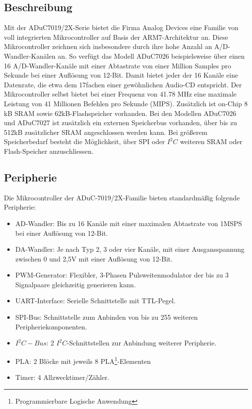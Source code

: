     \subsection{Beschreibung}
        Mit der ADuC7019/2X-Serie bietet die Firma Analog Devices eine Familie von voll integrierten Mikrocontroller 
        auf Basis der ARM7-Architektur an. Diese Mikrocontroller zeichnen sich insbesondere durch ihre hohe Anzahl
        an A/D-Wandler-Kanälen an. So verfügt das Modell ADuC7026 beispielsweise über einen 16 A/D-Wandler-Kanäle
        mit einer Abtastrate von einer Million Samples pro Sekunde bei einer Auflösung von 12-Bit. Damit bietet jeder
        der 16 Kanäle eine Datenrate, die etwa dem 17fachen einer gewöhnlichen Audio-CD entspricht.
        Der Mikrocontroller selbst bietet bei einer Frequenz von 41.78 MHz eine maximale Leistung von 41 Millionen
        Befehlen pro Sekunde (MIPS). Zusätzlich ist on-Chip 8 kB SRAM sowie 62kB-Flashspeicher vorhanden. Bei den Modellen
        ADuC7026 und ADuC7027 ist zusätzlich ein externen Speicherbus vorhanden, über bis zu 512kB zusätzlicher SRAM
        angeschlossen werden kann. Bei größerem Speicherbedarf besteht die Möglichkeit, über SPI oder $I^2C$ weiteren SRAM 
        oder Flash-Speicher anzuschliessen.

    \subsection{Peripherie}
        Die Mikrocontroller der ADuC-7019/2X-Familie bieten standardmäßig folgende Peripherie:

        \begin{itemize}
            \item{AD-Wandler:} Bis zu 16 Kanäle mit einer maximalen Abtastrate von 1MSPS bei einer Auflösung von 12-Bit.
            \item{DA-Wandler:} Je nach Typ 2, 3 oder vier Kanäle, mit einer Ausgansspannung zwischen 0 und 2,5V mit einer
                               Auflösung von 12-Bit.
            \item{PWM-Generator:} Flexibler, 3-Phasen Pulsweitenmodulator der bis zu 3 Signalpaare gleichzeitig generieren kann.
            \item{UART-Interface:} Serielle Schnittstelle mit TTL-Pegel.
            \item{SPI-Bus:} Schnittstelle zum Anbinden von bis zu 255 weiteren Peripheriekomponenten.
            \item{$I^2C-Bus$:} 2 $I^2C$-Schnittstellen zur Anbindung weiterer Peripherie.
            \item{PLA:} 2 Blöcke mit jeweils 8 PLA\footnote{Programmierbare Logische Anwendung}-Elementen 
            \item{Timer:} 4 Allzwecktimer/Zähler.
        \end{itemize}
        
